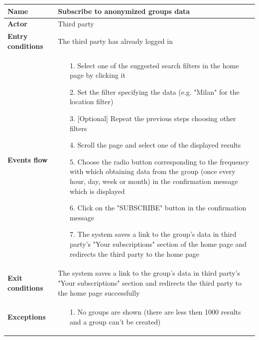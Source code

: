 \begin{table}[]
\begin{adjustbox}{width=\textwidth}
\footnotesize
\begin{tabular}{|p{}|p{}|}
\hline
\textbf{Name}             &  Subscribe to anonymized groups data\\ \hline
\textbf{Actor}            &  Third party\\ \hline
\textbf{Entry conditions} &  The third party has already logged in\\ \hline
\textbf{Events flow}      &
	\begin{itemize}
		\item[1.] Select one of the suggested search filters in the home page by clicking it
		\item[2.] Set the filter specifying the data (e.g. "Milan" for the location filter)
		\item[3.] [Optional] Repeat the previous steps choosing other filters
		\item[4.] Scroll the page and select one of the displayed results
		\item[5.] Choose the radio button corresponding to the frequency with which obtaining data from the group (once every hour, day, week or month) in the confirmation message which is displayed
		\item[6.] Click on the "SUBSCRIBE" button in the confirmation message
		\item[7.] The system saves a link to the group's data in third party's "Your subscriptions" section of the home page and redirects the third party to the home page
	\end{itemize}\\ \hline
\textbf{Exit conditions}  &  The system saves a link to the group's data in third party's "Your subscriptions" section and redirects the third party to the home page successfully\\ \hline
\textbf{Exceptions}       &
	\begin{itemize}
		\item[1.] No groups are shown (there are less then 1000 results and a group can't be created)
	\end{itemize}\\ \hline
\end{tabular}
\end{adjustbox}
\end{table}

